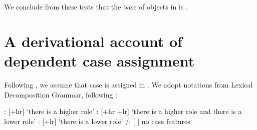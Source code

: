 \documentclass[output=paper,modfonts,newtxmath,hidelinks]{langscibook}
\begin{document}
	
	\ea
    \z \z
	

\noindent We conclude from these tests that the base  of objects in  is  \before{} . 

\section{A derivational account of dependent case assignment}
\largerpage[3]
Following \citet{bakervinokurova,baker15,preminger-book,levinpreminger}, we assume that case is assigned in . We adopt  notations from Lexical Decomposition Grammar, following \citet{kiparsky92,kiparsky2001,wunderlichjoppen,wunderlich97,stiebels2002}:

\ea
\ea \accc: [+hr] `there is a higher role'
\ex \datt: [+hr +lr] `there is a higher role and there is a lower role'
\ex \ergg: [+lr] `there is a lower role' 
\ex \nomm/\abss: [{} {}] no case features 
\z \z
\end{document}
